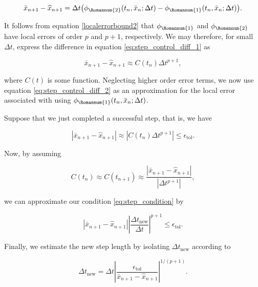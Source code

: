 \begin{equation}\label{eq:step_control_diff_1}
\bar{x}_{n+1} - \widehat{x}_{n+1} = \Delta t\big( \phi_{\Romannum{2}}(t_n,\bar{x}_n;\Delta t)- \phi_{\Romannum{1}}(t_n,\bar{x}_n;\Delta t)\big).
\end{equation}

\noindent It follows from equation \eqref{localerrorbound2} that $\phi_{\Romannum{1}}$ and $\phi_{\Romannum{2}}$ have local errors of order $p$ and $p+1$, respectively. We may therefore, for small $\Delta t$, express the difference in equation \eqref{eq:step_control_diff_1} as

\begin{equation}\label{eq:step_control_diff_2}
\bar{x}_{n+1} - \widehat{x}_{n+1} \approx C(t_n)\Delta t^{p+1},
\end{equation}

\noindent where $C(t)$ is some function. Neglecting higher order error terms, we now use equation \eqref{eq:step_control_diff_2} as an approximation for the local error associated with using $\phi_{\Romannum{1}}(t_n,\bar{x}_n;\Delta t)$.

Suppose that we just completed a successful step, that is, we have

\begin{equation}\label{eq:step_condition}
\left|\bar{x}_{n+1}-\widehat{x}_{n+1}\right| \approx \left|C(t_n)\Delta t^{p+1}\right| \leq \epsilon_{\text{tol}}.
\end{equation}

\noindent Now, by assuming 

\begin{equation}
C(t_n)\approx C(t_{n+1}) \approx \frac{\left| \bar{x}_{n+1} - \widehat{x}_{n+1}\right|}{\left| \Delta t^{p+1}\right|},
\end{equation}

\noindent we can approximate our condition \eqref{eq:step_condition} by

\begin{equation}
\left| \bar{x}_{n+1} - \widehat{x}_{n+1}\right|\left|\frac{\Delta t_{\text{new}}}{\Delta t}\right|^{p+1} \leq \epsilon_{\text{tol}}.
\end{equation}

\noindent Finally, we estimate the new step length by isolating $\Delta t_{\text{new}}$ according to

\begin{equation}\label{eq:dt_new}
\Delta t_{\text{new}} = \Delta t\left|\frac{\epsilon_{\text{tol}}}{\bar{x}_{n+1} - \widehat{x}_{n+1}}\right|^{1/(p+1)}.
\end{equation}

